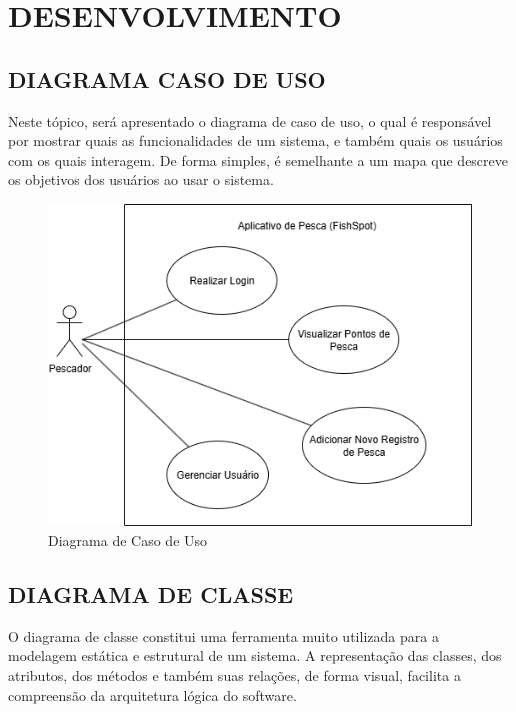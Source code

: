 
\chapter{DESENVOLVIMENTO}
\label{chap:desenvolvimento}

\section{DIAGRAMA CASO DE USO}
\label{sec:diagramacasodeuso}

Neste tópico, será apresentado o diagrama de caso de uso, o qual é responsável por mostrar quais as funcionalidades de um sistema, e também quais os usuários com os quais interagem. De forma simples, é semelhante a um mapa que descreve os objetivos dos usuários ao usar o sistema.

\begin{figure}[H]
    \centering
    \caption{Diagrama de Caso de Uso}
    \label{fig:casoDeUso}
    \includegraphics[scale=0.8]{./dados/figuras/diagrama-de-caso-de-uso.png}
\end{figure}


\section{DIAGRAMA DE CLASSE}
\label{sec:diagramadeclasse}

O diagrama de classe constitui uma ferramenta muito utilizada para a modelagem estática e estrutural de um sistema. A representação das classes, dos atributos, dos métodos e também suas relações, de forma visual, facilita a compreensão da arquitetura lógica do software.

